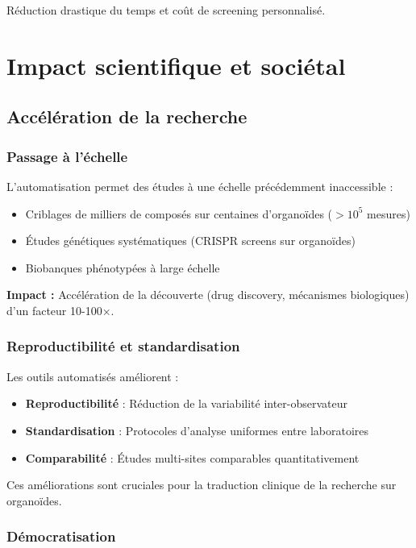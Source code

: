 Réduction drastique du temps et coût de screening personnalisé.

\section{Impact scientifique et sociétal}

\subsection{Accélération de la recherche}

\subsubsection{Passage à l'échelle}

L'automatisation permet des études à une échelle précédemment inaccessible :
\begin{itemize}
    \item Criblages de milliers de composés sur centaines d'organoïdes ($>10^5$ mesures)
    \item Études génétiques systématiques (CRISPR screens sur organoïdes)
    \item Biobanques phénotypées à large échelle
\end{itemize}

\textbf{Impact :}
Accélération de la découverte (drug discovery, mécanismes biologiques) d'un facteur 10-100×.

\subsubsection{Reproductibilité et standardisation}

Les outils automatisés améliorent :
\begin{itemize}
    \item \textbf{Reproductibilité} : Réduction de la variabilité inter-observateur
    \item \textbf{Standardisation} : Protocoles d'analyse uniformes entre laboratoires
    \item \textbf{Comparabilité} : Études multi-sites comparables quantitativement
\end{itemize}

Ces améliorations sont cruciales pour la traduction clinique de la recherche sur organoïdes.

\subsubsection{Démocratisation}

